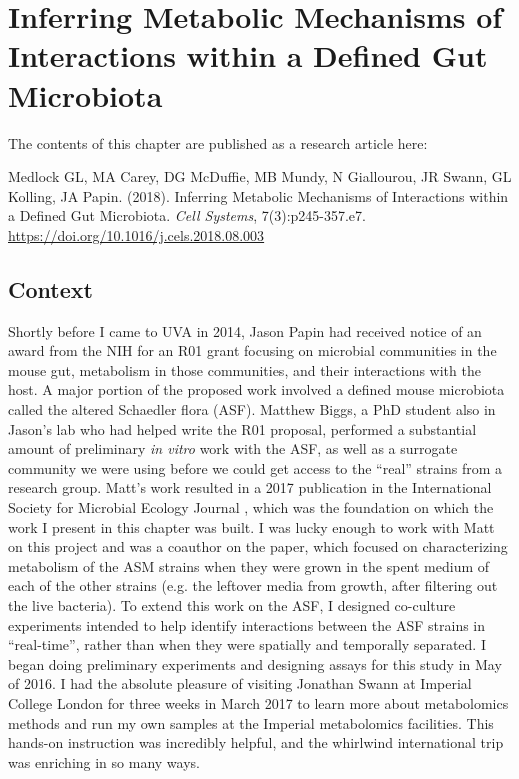 \documentclass[11pt,onecolumn,notitlepage,openany,twoside]{book}
\begin{document}
\chapter{Inferring Metabolic Mechanisms of Interactions within a Defined Gut Microbiota}

\begin{refsection}

The contents of this chapter are published as a research article here:

\medskip\noindent
Medlock GL, MA Carey, DG McDuffie, MB Mundy, N Giallourou, JR Swann, GL Kolling, JA Papin. (2018). Inferring Metabolic Mechanisms of Interactions within a Defined Gut Microbiota. \textit{Cell Systems}, 7(3):p245-357.e7. \url{https://doi.org/10.1016/j.cels.2018.08.003}

\section{Context}

Shortly before I came to UVA in 2014, Jason Papin had received notice of an award from the NIH for an R01 grant focusing on microbial communities in the mouse gut, metabolism in those communities, and their interactions with the host. A major portion of the proposed work involved a defined mouse microbiota called the altered Schaedler flora (ASF). Matthew Biggs, a PhD student also in Jason's lab who had helped write the R01 proposal, performed a substantial amount of preliminary \textit{in vitro} work with the ASF, as well as a surrogate community we were using before we could get access to the ``real'' strains from a research group. Matt's work resulted in a 2017 publication in the International Society for Microbial Ecology Journal \cite{Biggs2017-fs}, which was the foundation on which the work I present in this chapter was built. I was lucky enough to work with Matt on this project and was a coauthor on the paper, which focused on characterizing metabolism of the ASM strains when they were grown in the spent medium of each of the other strains (e.g. the leftover media from growth, after filtering out the live bacteria). To extend this work on the ASF, I designed co-culture experiments intended to help identify interactions between the ASF strains in ``real-time'', rather than when they were spatially and temporally separated. I began doing preliminary experiments and designing assays for this study in May of 2016. I had the absolute pleasure of visiting Jonathan Swann at Imperial College London for three weeks in March 2017 to learn more about metabolomics methods and run my own samples at the Imperial metabolomics facilities. This hands-on instruction was incredibly helpful, and the whirlwind international trip was enriching in so many ways.


\end{refsection}
\end{document}
